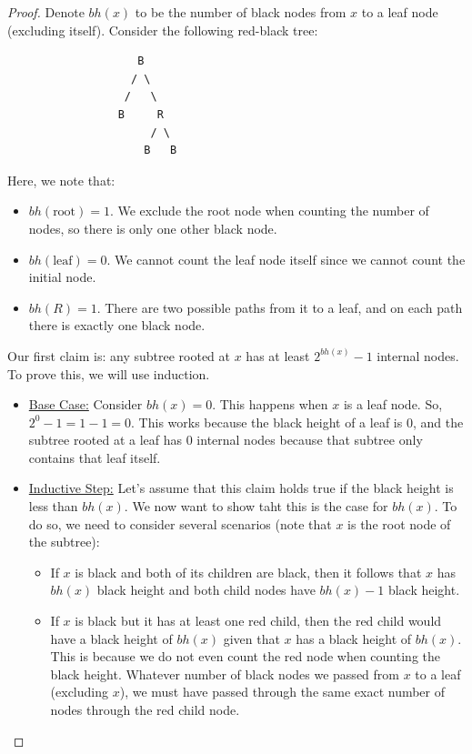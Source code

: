 \documentclass[letterpaper]{article}
\begin{document}
\begin{mdframed}
    \begin{proof}
        Denote $bh(x)$ to be the number of black nodes from $x$ to a leaf node (excluding itself). Consider the following red-black tree: 
        \begin{verbatim}
                    B
                   / \ 
                  /   \ 
                 B     R
                      / \ 
                     B   B
        \end{verbatim}
        Here, we note that: 
        \begin{itemize}
            \item $bh(\text{root}) = 1$. We exclude the root node when counting the number of nodes, so there is only one other black node. 
            \item $bh(\text{leaf}) = 0$. We cannot count the leaf node itself since we cannot count the initial node. 
            \item $bh(R) = 1$. There are two possible paths from it to a leaf, and on each path there is exactly one black node. 
        \end{itemize}
        Our first claim is: any subtree rooted at $x$ has at least $2^{bh(x)} - 1$ internal nodes. To prove this, we will use induction. 
        \begin{itemize}
            \item \underline{Base Case:} Consider $bh(x) = 0$. This happens when $x$ is a leaf node. So, $2^0 - 1 = 1 - 1 = 0$. This works because the black height of a leaf is 0, and the subtree rooted at a leaf has 0 internal nodes because that subtree only contains that leaf itself.
            \item \underline{Inductive Step:} Let's assume that this claim holds true if the black height is less than $bh(x)$. We now want to show taht this is the case for $bh(x)$. To do so, we need to consider several scenarios (note that $x$ is the root node of the subtree): 
            \begin{itemize}
                \item If $x$ is black and both of its children are black, then it follows that $x$ has $bh(x)$ black height and both child nodes have $bh(x) - 1$ black height. 
                \item If $x$ is black but it has at least one red child, then the red child would have a black height of $bh(x)$ given that $x$ has a black height of $bh(x)$. This is because we do not even count the red node when counting the black height. Whatever number of black nodes we passed from $x$ to a leaf (excluding $x$), we must have passed through the same exact number of nodes through the red child node.

\end{itemize}
\end{itemize}
\end{proof}
\end{mdframed}
\end{document}
